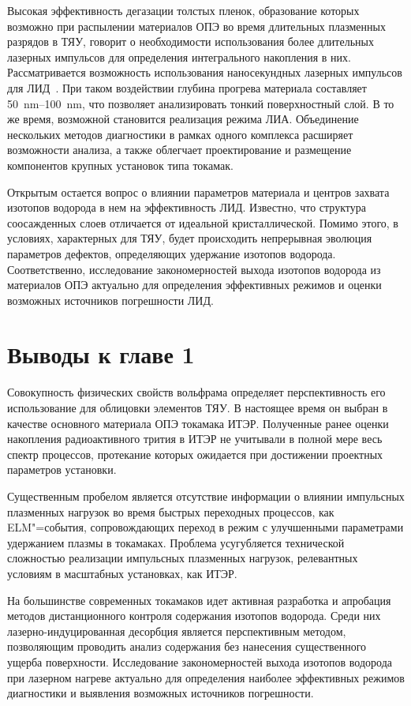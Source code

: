 Высокая эффективность дегазации толстых пленок, образование которых возможно при распылении материалов ОПЭ во время длительных плазменных разрядов в ТЯУ, говорит о необходимости использования более длительных лазерных импульсов для определения интегрального накопления в них. Рассматривается возможность использования наносекундных лазерных импульсов для ЛИД~\cite{Medvedev2024, Gasparyan2021, Efimov2024}. При таком воздействии глубина прогрева материала составляет \SIrange{50}{100}{\nano\meter}, что позволяет анализировать тонкий поверхностный слой. В то же время, возможной становится реализация режима ЛИА. Объединение нескольких методов диагностики в рамках одного комплекса расширяет возможности анализа, а также облегчает проектирование и размещение компонентов крупных установок типа токамак.

Открытым остается вопрос о влиянии параметров материала и центров захвата изотопов водорода в нем на эффективность ЛИД. Известно, что структура соосажденных слоев отличается от идеальной кристаллической. Помимо этого, в условиях, характерных для ТЯУ, будет происходить непрерывная эволюция параметров дефектов, определяющих удержание изотопов водорода. Соответственно, исследование закономерностей выхода изотопов водорода из материалов ОПЭ актуально для определения эффективных режимов и оценки возможных источников погрешности ЛИД. 

\section{Выводы к главе 1}

Совокупность физических свойств вольфрама определяет перспективность его использование для облицовки элементов ТЯУ. В настоящее время он выбран в качестве основного материала ОПЭ токамака ИТЭР. Полученные ранее оценки накопления радиоактивного трития в ИТЭР не учитывали в полной мере весь спектр процессов, протекание которых ожидается при достижении проектных параметров установки. 

Существенным пробелом является отсутствие информации о влиянии импульсных плазменных нагрузок во время быстрых переходных процессов, как ELM"=события, сопровождающих переход в режим с улучшенными параметрами удержанием плазмы в токамаках. Проблема усугубляется технической сложностью реализации импульсных плазменных нагрузок, релевантных условиям в масштабных установках, как ИТЭР. 

На большинстве современных токамаков идет активная разработка и апробация методов дистанционного контроля содержания изотопов водорода. Среди них лазерно-индуцированная десорбция является перспективным методом, позволяющим проводить анализ содержания без нанесения существенного ущерба поверхности. Исследование закономерностей выхода изотопов водорода при лазерном нагреве актуально для определения наиболее эффективных режимов диагностики и выявления возможных источников погрешности.

